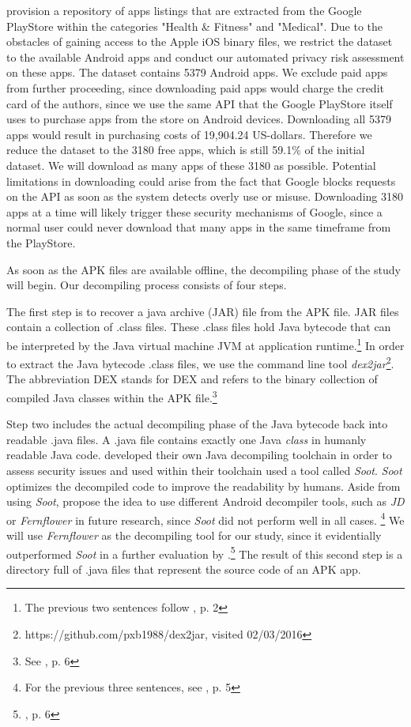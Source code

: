 \documentclass[
	a4paper,
	oneside,
	12pt,
	liststotocnumbered
]{article}
\let\cite\textcite
\begin{document}
\cite{Xu2015} provision a repository of apps listings that are extracted from the Google PlayStore within the categories "Health \& Fitness" and "Medical".
Due to the obstacles of gaining access to the Apple iOS binary files, we restrict the dataset to the available Android apps and conduct our automated privacy risk assessment on these apps.
The \cite{Xu2015} dataset contains 5379 Android apps. 
We exclude paid apps from further proceeding, since downloading paid apps would charge the credit card of the authors, since we use the same \acs{API} that the Google PlayStore itself uses to purchase apps from the store on Android devices. 
Downloading all 5379 apps would result in purchasing costs of 19,904.24 US-dollars. 
Therefore we reduce the dataset to the 3180 free apps, which is still 59.1\% of the  initial dataset. 
We will download as many apps of these 3180 as possible.
Potential limitations in downloading could arise from the fact that Google blocks requests on the API as soon as the system detects overly use or misuse. Downloading 3180 apps at a time will likely trigger these security mechanisms of Google, since a normal user could never download that many apps in the same timeframe from the PlayStore.

As soon as the \acs{APK} files are available offline, the decompiling phase of the study will begin.
Our decompiling process consists of four steps.

The first step is to recover a java archive (\acs{JAR}) file from the \acs{APK} file.
\acs{JAR} files contain a collection of .class files. 
These .class files hold Java bytecode that can be interpreted by the Java virtual machine \acs{JVM} at application runtime.\footnote{The previous two sentences follow \cite{Enck2011}, p. 2} 
In order to extract the Java bytecode .class files, we use the command line tool \textit{dex2jar}\footnote{https://github.com/pxb1988/dex2jar, visited 02/03/2016}. 
The abbreviation \acs{DEX} stands for \acl{DEX} and refers to the binary collection of compiled Java classes within the \acs{APK} file.\footnote{See \cite{xu2013techniques}, p. 6}

Step two includes the actual decompiling phase of the Java bytecode back into readable .java files. 
A .java file contains exactly one Java \textit{class} in humanly readable Java code. 
\cite{Enck2011} developed their own Java decompiling toolchain in order to assess security issues and used within their toolchain used a tool called \textit{Soot}.
\textit{Soot} optimizes the decompiled code to improve the readability by humans.
Aside from using \textit{Soot}, \cite{Enck2011} propose the idea to use different Android decompiler tools, such as \textit{JD} or \textit{Fernflower} in future research, since \textit{Soot} did not perform well in all cases.  \footnote{For the previous three sentences, see \cite{Enck2011}, p. 5}
We will use \textit{Fernflower} as the decompiling tool for our study, since it evidentially outperformed \textit{Soot} in a further evaluation by \cite{Enck2011}.\footnote{\cite{Enck2011}, p. 6}
The result of this second step is a directory full of .java files that represent the source code of an \acs{APK} app.
\end{document}
